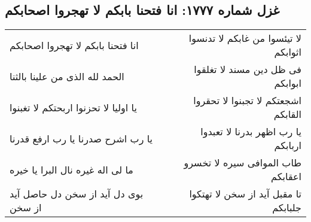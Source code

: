 \begin{center}
\section*{غزل شماره ۱۷۷۷: انا فتحنا بابکم لا تهجروا اصحابکم}
\label{sec:1777}
\begin{longtable}{l p{0.5cm} r}
انا فتحنا بابکم لا تهجروا اصحابکم
&&
لا تیئسوا من غابکم لا تدنسوا اثوابکم
\\
الحمد لله الذی من علینا بالثنا
&&
فی ظل دین مسند لا تغلقوا ابوابکم
\\
یا اولیا لا تحزنوا اربحتکم لا تغبنوا
&&
اشجعتکم لا تجبنوا لا تحقروا القابکم
\\
یا رب اشرح صدرنا یا رب ارفع قدرنا
&&
یا رب اظهر بدرنا لا تعبدوا اربابکم
\\
ما لی اله غیره نال البرا یا خیره
&&
طاب الموافی سیره لا تخسرو اعقابکم
\\
بوی دل آید از سخن دل حاصل آید از سخن
&&
تا مقبل آید از سخن لا تهتکوا جلبابکم
\\
\end{longtable}
\end{center}
